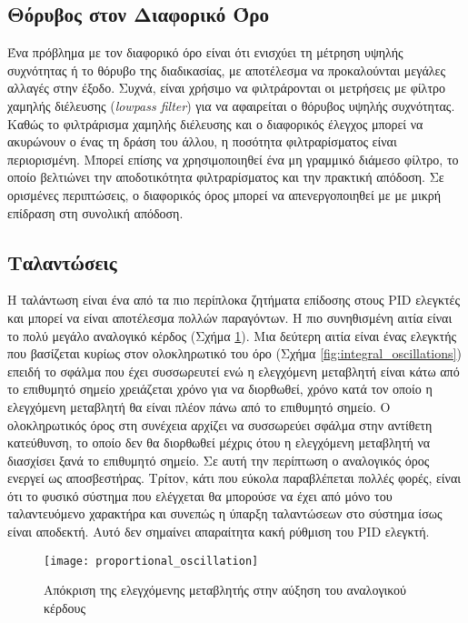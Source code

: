 \subsection{Θόρυβος στον Διαφορικό Όρο}

Ένα πρόβλημα με τον διαφορικό όρο είναι ότι ενισχύει τη μέτρηση υψηλής συχνότητας ή το θόρυβο της διαδικασίας, με αποτέλεσμα να προκαλούνται μεγάλες αλλαγές στην έξοδο. Συχνά, είναι χρήσιμο να φιλτράρονται οι μετρήσεις με φίλτρο χαμηλής διέλευσης (\emph{lowpass filter}) για να αφαιρείται ο θόρυβος υψηλής συχνότητας. Καθώς το φιλτράρισμα χαμηλής διέλευσης και ο διαφορικός έλεγχος μπορεί να ακυρώνουν ο ένας τη δράση του άλλου, η ποσότητα φιλτραρίσματος είναι περιορισμένη. Μπορεί επίσης να χρησιμοποιηθεί ένα μη γραμμικό διάμεσο φίλτρο, το οποίο βελτιώνει την αποδοτικότητα φιλτραρίσματος και την πρακτική απόδοση.
Σε ορισμένες περιπτώσεις, ο διαφορικός όρος μπορεί να απενεργοποιηθεί με με μικρή επίδραση στη συνολική απόδοση.

\subsection{Ταλαντώσεις}

Η ταλάντωση είναι ένα από τα πιο περίπλοκα ζητήματα επίδοσης στους PID ελεγκτές και μπορεί να είναι αποτέλεσμα πολλών παραγόντων. Η πιο συνηθισμένη αιτία είναι το πολύ μεγάλο αναλογικό κέρδος (Σχήμα \ref{fig:proportional_oscillation}). Μια δεύτερη αιτία είναι ένας ελεγκτής που βασίζεται κυρίως στον ολοκληρωτικό του όρο (Σχήμα \ref{fig:integral_oscillations}) επειδή το σφάλμα που έχει συσσωρευτεί ενώ η ελεγχόμενη μεταβλητή είναι κάτω από το επιθυμητό σημείο χρειάζεται χρόνο για να διορθωθεί, χρόνο κατά τον οποίο η ελεγχόμενη μεταβλητή θα είναι πλέον πάνω από το επιθυμητό σημείο. Ο ολοκληρωτικός όρος στη συνέχεια αρχίζει να συσσωρεύει σφάλμα στην αντίθετη κατεύθυνση, το οποίο δεν θα διορθωθεί μέχρις ότου η ελεγχόμενη μεταβλητή να διασχίσει ξανά το επιθυμητό σημείο. Σε αυτή την περίπτωση ο αναλογικός όρος ενεργεί ως αποσβεστήρας. Τρίτον, κάτι που εύκολα παραβλέπεται πολλές φορές, είναι ότι το φυσικό σύστημα που ελέγχεται θα μπορούσε να έχει από μόνο του ταλαντευόμενο χαρακτήρα και συνεπώς η ύπαρξη ταλαντώσεων στο σύστημα ίσως είναι αποδεκτή. Αυτό δεν σημαίνει απαραίτητα κακή ρύθμιση του PID ελεγκτή.

\begin{figure}[h]
  \centering
  \texttt{[image: proportional\_oscillation]}
  \caption{Απόκριση της ελεγχόμενης μεταβλητής στην αύξηση του αναλογικού κέρδους}
  \label{fig:proportional_oscillation}
\end{figure}

